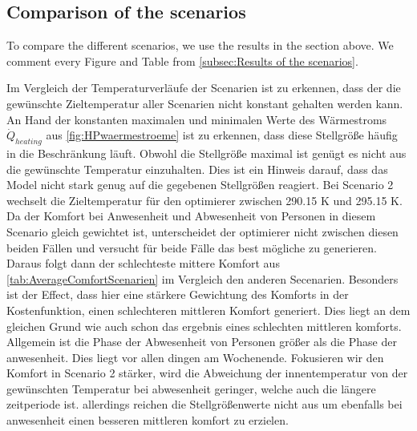 \subsection{Comparison of the scenarios}
\label{subsec:Comparison fo the scenarios}
To compare the different scenarios, we use the results in the section above. We comment every Figure and Table from \autoref{subsec:Results of the scenarios}.

Im Vergleich der Temperaturverläufe der Scenarien ist zu erkennen, dass der die gewünschte Zieltemperatur aller Scenarien nicht konstant gehalten werden kann. An Hand der konstanten maximalen und minimalen Werte des Wärmestroms $\dot{Q}_{heating}$ aus \autoref{fig:HPwaermestroeme} ist zu erkennen, dass diese Stellgröße häufig in die Beschränkung läuft. Obwohl die Stellgröße maximal ist genügt es nicht aus die gewünschte Temperatur einzuhalten. Dies ist ein Hinweis darauf, dass das Model nicht stark genug auf die gegebenen Stellgrößen reagiert.\newline
Bei Scenario 2 wechselt die Zieltemperatur für den optimierer zwischen 290.15 K und 295.15 K. Da der Komfort bei Anwesenheit und Abwesenheit von Personen in diesem Scenario gleich gewichtet ist, unterscheidet der optimierer nicht zwischen diesen beiden Fällen und versucht für beide Fälle das best mögliche zu generieren. Daraus folgt dann der schlechteste mittere Komfort aus \autoref{tab:AverageComfortScenarien} im Vergleich den anderen Secenarien. Besonders ist der Effect, dass hier eine stärkere Gewichtung des Komforts in der Kostenfunktion, einen schlechteren mittleren Komfort generiert. Dies liegt an dem gleichen Grund wie auch schon das ergebnis eines schlechten mittleren komforts.
Allgemein ist die Phase der Abwesenheit von Personen größer als die Phase der anwesenheit. Dies liegt vor allen dingen am Wochenende. Fokusieren wir den Komfort in Scenario 2 stärker, wird die Abweichung der innentemperatur von der gewünschten Temperatur bei abwesenheit geringer, welche auch die längere zeitperiode ist. allerdings reichen die Stellgrößenwerte nicht aus um ebenfalls bei anwesenheit einen besseren mittleren komfort zu erzielen.\newline
